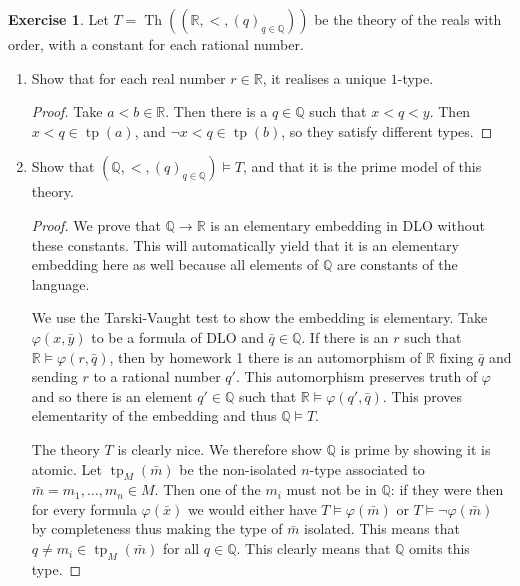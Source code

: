 \documentclass{article}
\newcommand{\Q}{\mathbb{Q}}
\newcommand{\R}{\mathbb{R}}
\DeclareMathOperator{\theory}{Th}
\DeclareMathOperator{\type}{tp}
\theoremstyle{definition}
\newtheorem{question}{Exercise}
\begin{document}
\begin{question}
    Let \(T=\theory((\R,<,(q)_{q\in\Q}))\) be the theory of the reals with
    order, with a constant for each rational number.

    \begin{enumerate}[(1)]
        \item Show that for each real number \(r\in\R\), it realises a unique
              \(1\)-type.

              \begin{proof}
                  Take \(a<b\in\R\). Then there is a \(q\in\Q\) such that
                  \(x<q<y\). Then \(x<q\in\type(a)\), and \(\neg
                  x<q\in\type(b)\), so they satisfy different types.
              \end{proof}

        \item Show that \((\Q,<,(q)_{q\in\Q})\models T\), and that it is the
              prime model of this theory.

              \begin{proof}
                  We prove that \(\Q\to\R\) is an elementary embedding in DLO
                  without these constants. This will automatically yield that it
                  is an elementary embedding here as well because all elements
                  of \(\Q\) are constants of the language.

                  We use the Tarski-Vaught test to show the embedding is
                  elementary. Take \(\varphi(x,\bar{y})\) to be a formula of DLO
                  and \(\bar{q}\in\Q\). If there is an \(r\) such that
                  \(\R\models\varphi(r,\bar{q})\), then by homework 1 there is
                  an automorphism of \(\R\) fixing \(\bar{q}\) and sending \(r\)
                  to a rational number \(q'\). This automorphism preserves truth
                  of \(\varphi\) and so there is an element \(q'\in\Q\) such
                  that \(\R\models\varphi(q',\bar{q})\). This proves
                  elementarity of the embedding and thus \(\Q\models T\).

                  The theory \(T\) is clearly nice. We therefore show \(\Q\) is
                  prime by showing it is atomic. Let \(\type_{M}(\bar{m})\) be
                  the non-isolated \(n\)-type associated to
                  \(\bar{m}=m_{1},\ldots,m_{n}\in M\). Then one of the \(m_{i}\)
                  must not be in \(\Q\): if they were then for every formula
                  \(\varphi(\bar{x})\) we would either have
                  \(T\models\varphi(\bar{m})\) or
                  \(T\models\neg\varphi(\bar{m})\) by completeness thus making
                  the type of \(\bar{m}\) isolated. This means that \(q\neq
                  m_{i}\in\type_{M}(\bar{m})\) for all \(q\in\Q\). This clearly
                  means that \(\Q\) omits this type.


\end{proof}
\end{enumerate}
\end{question}
\end{document}
